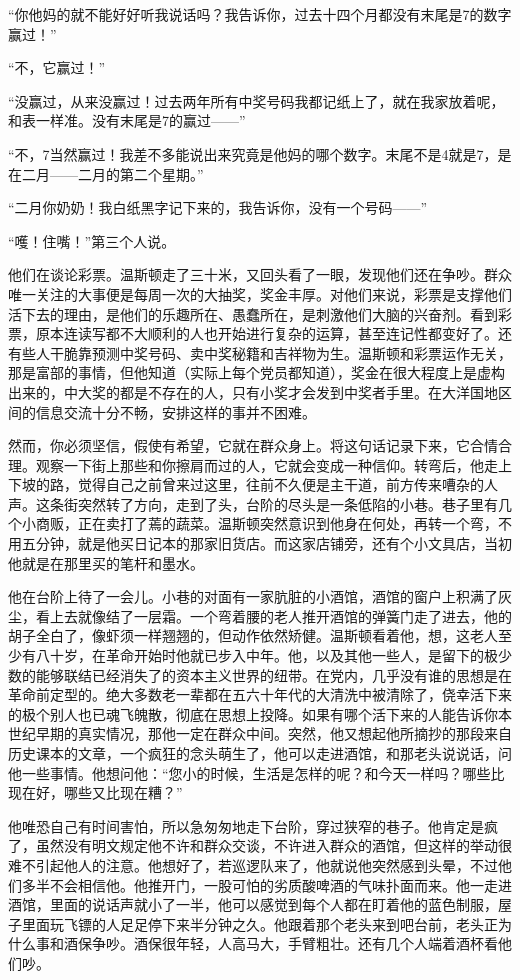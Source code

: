 ``你他妈的就不能好好听我说话吗？我告诉你，过去十四个月都没有末尾是7的数字赢过！''

``不，它赢过！''

``没赢过，从来没赢过！过去两年所有中奖号码我都记纸上了，就在我家放着呢，和表一样准。没有末尾是7的赢过------''

``不，7当然赢过！我差不多能说出来究竟是他妈的哪个数字。末尾不是4就是7，是在二月------二月的第二个星期。''

``二月你奶奶！我白纸黑字记下来的，我告诉你，没有一个号码------''

``嚄！住嘴！''第三个人说。

他们在谈论彩票。温斯顿走了三十米，又回头看了一眼，发现他们还在争吵。群众唯一关注的大事便是每周一次的大抽奖，奖金丰厚。对他们来说，彩票是支撑他们活下去的理由，是他们的乐趣所在、愚蠢所在，是刺激他们大脑的兴奋剂。看到彩票，原本连读写都不大顺利的人也开始进行复杂的运算，甚至连记性都变好了。还有些人干脆靠预测中奖号码、卖中奖秘籍和吉祥物为生。温斯顿和彩票运作无关，那是富部的事情，但他知道（实际上每个党员都知道），奖金在很大程度上是虚构出来的，中大奖的都是不存在的人，只有小奖才会发到中奖者手里。在大洋国地区间的信息交流十分不畅，安排这样的事并不困难。

然而，你必须坚信，假使有希望，它就在群众身上。将这句话记录下来，它合情合理。观察一下街上那些和你擦肩而过的人，它就会变成一种信仰。转弯后，他走上下坡的路，觉得自己之前曾来过这里，往前不久便是主干道，前方传来嘈杂的人声。这条街突然转了方向，走到了头，台阶的尽头是一条低陷的小巷。巷子里有几个小商贩，正在卖打了蔫的蔬菜。温斯顿突然意识到他身在何处，再转一个弯，不用五分钟，就是他买日记本的那家旧货店。而这家店铺旁，还有个小文具店，当初他就是在那里买的笔杆和墨水。

他在台阶上待了一会儿。小巷的对面有一家肮脏的小酒馆，酒馆的窗户上积满了灰尘，看上去就像结了一层霜。一个弯着腰的老人推开酒馆的弹簧门走了进去，他的胡子全白了，像虾须一样翘翘的，但动作依然矫健。温斯顿看着他，想，这老人至少有八十岁，在革命开始时他就已步入中年。他，以及其他一些人，是留下的极少数的能够联结已经消失了的资本主义世界的纽带。在党内，几乎没有谁的思想是在革命前定型的。绝大多数老一辈都在五六十年代的大清洗中被清除了，侥幸活下来的极个别人也已魂飞魄散，彻底在思想上投降。如果有哪个活下来的人能告诉你本世纪早期的真实情况，那他一定在群众中间。突然，他又想起他所摘抄的那段来自历史课本的文章，一个疯狂的念头萌生了，他可以走进酒馆，和那老头说说话，问他一些事情。他想问他：``您小的时候，生活是怎样的呢？和今天一样吗？哪些比现在好，哪些又比现在糟？''

他唯恐自己有时间害怕，所以急匆匆地走下台阶，穿过狭窄的巷子。他肯定是疯了，虽然没有明文规定他不许和群众交谈，不许进入群众的酒馆，但这样的举动很难不引起他人的注意。他想好了，若巡逻队来了，他就说他突然感到头晕，不过他们多半不会相信他。他推开门，一股可怕的劣质酸啤酒的气味扑面而来。他一走进酒馆，里面的说话声就小了一半，他可以感觉到每个人都在盯着他的蓝色制服，屋子里面玩飞镖的人足足停下来半分钟之久。他跟着那个老头来到吧台前，老头正为什么事和酒保争吵。酒保很年轻，人高马大，手臂粗壮。还有几个人端着酒杯看他们吵。


